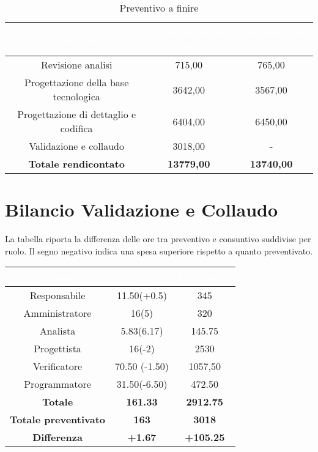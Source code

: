 \begin{flushleft}
		\begin{table}[!h]
		\begin{center}
			
			
			\begin{tabular}{ccc}
				
				\rowcolor{coolblack}
				\hline
				\textcolor{white}{Periodo} & \textcolor{white}{Preventivo in \euro} & \textcolor{white}{Consuntivo in \euro}\\
				\hline
				Revisione analisi& 715,00 & 765,00 \\ 	
				Progettazione della base tecnologica& 3642,00 & 3567,00\\ 
				Progettazione di dettaglio e codifica& 6404,00   & 6450,00\\ 
				Validazione e collaudo & 3018,00 & - \\ \hline
				\textbf{Totale rendicontato}& \textbf{13779,00} & \textbf{13740,00}	\\ \hline   
				
			\end{tabular}
			\caption{Preventivo a finire} 
		\end{center}		
	\end{table}

	\section{Bilancio Validazione e Collaudo}\label{BilVC}
La tabella riporta la differenza delle ore tra preventivo e consuntivo suddivise per ruolo. Il segno negativo indica una spesa superiore rispetto a quanto preventivato.\\
		\begin{table}[!h]
		\begin{center}
			\begin{tabular}{ccc}
				\rowcolor{coolblack}
				\hline
				\textcolor{white}{Ruolo} & \textcolor{white}{Ore} & \textcolor{white}{Costo in \euro}\\
				\hline
				Responsabile   & 11.50(+0.5)	&  	345 	\\ 
				Amministratore & 16(5)	&  	320 	\\ 
				Analista       & 5.83(6.17) &   145.75\\ 
				Progettista    & 16(-2)&   2530	\\ 
				Verificatore   & 70.50	(-1.50)&  	1057,50	\\ 
				Programmatore  & 31.50(-6.50)&   472.50	\\ \hline
				\textbf{Totale}& \textbf{161.33} & \textbf{2912.75}	\\ \hline 
				\textbf{Totale preventivato}& \textbf{163} & \textbf{3018}\\ \hline 
				\textbf{Differenza}& \textbf{+1.67} & \textbf{+105.25}	\\ \hline  
			\end{tabular}
			

\end{center}
\end{table}
\end{flushleft}
